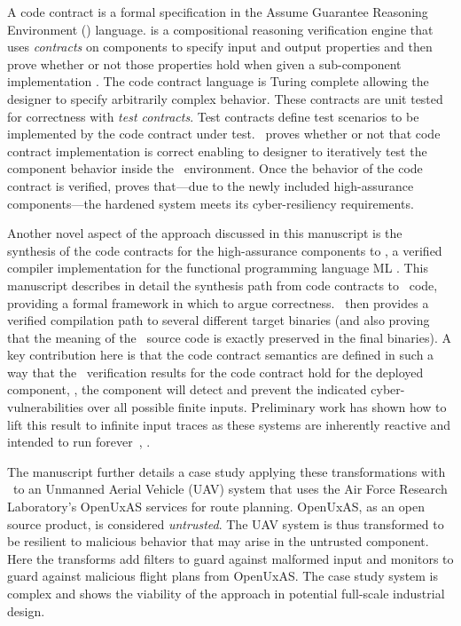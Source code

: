 A code contract is a formal specification in the Assume Guarantee Reasoning
Environment (\agr) language.
\agr is a compositional reasoning verification engine that uses \emph{contracts} on components to specify input and output properties and then prove whether or not those properties hold when given a sub-component implementation \cite{agree2013}.
The code contract language is Turing complete allowing the designer to specify arbitrarily complex behavior.
These contracts are unit tested for correctness with \emph{test contracts}.
Test contracts define test scenarios to be implemented by the code contract under test. 
\agr\ proves whether or not that code contract implementation is correct enabling to designer to iteratively test the component behavior inside the \brfcs\ environment.
Once the behavior of the code contract is verified, \agr proves that---due to the newly
included high-assurance components---the hardened system meets its
cyber-resiliency requirements.

Another novel aspect of the approach discussed in this manuscript is the synthesis of the code contracts for the high-assurance components to \ckml, a verified
compiler implementation for the functional programming language
ML \cite{cakeml}. This manuscript describes in detail the synthesis path
from code contracts to \ckml\ code, providing a formal framework in
which to argue correctness. \ckml\ then provides a verified
compilation path to several different target binaries (and also
proving that the meaning of the \ckml\ source code is exactly
preserved in the final binaries). 
A key contribution here is that the code contract semantics are defined in such a way that the \agr\ verification 
results for the code contract hold for the deployed component, \ie, the component will detect
and prevent the indicated cyber-vulnerabilities over all possible
finite inputs. Preliminary work has shown how to lift this result to
infinite input traces as these systems are inherently reactive and
intended to run forever~\cite{case-verified-filter}, \cite{cakeml-space-cost}.

The manuscript further details a 
case study applying these transformations with \brfcs\ to an Unmanned Aerial
Vehicle (UAV) system that uses the Air Force Research Laboratory's
OpenUxAS services for route planning.
OpenUxAS, as an open source product, is considered \emph{untrusted}.
The UAV system is thus transformed to be resilient to malicious behavior that may arise in the untrusted component.
Here the transforms add filters to guard
against malformed input and monitors to guard against malicious flight plans from OpenUxAS. The case study
system is complex and shows
the viability of the approach in potential full-scale industrial
design.

